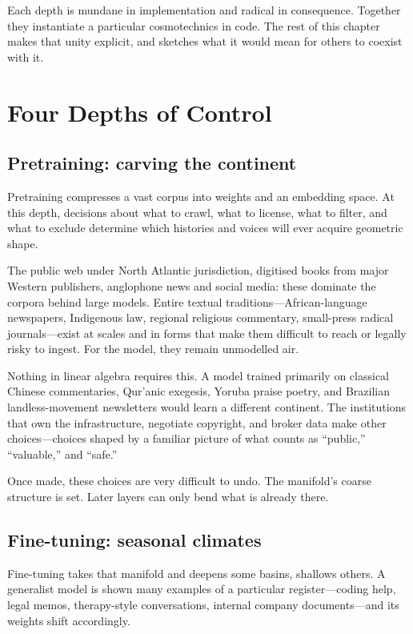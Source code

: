 \documentclass[12pt,a4paper]{article}
\begin{document}
Each depth is mundane in implementation and radical in consequence. Together they instantiate a particular cosmotechnics in code. The rest of this chapter makes that unity explicit, and sketches what it would mean for others to coexist with it.

\section{Four Depths of Control}

\subsection*{Pretraining: carving the continent}

Pretraining compresses a vast corpus into weights and an embedding space. At this depth, decisions about what to crawl, what to license, what to filter, and what to exclude determine which histories and voices will ever acquire geometric shape.

The public web under North Atlantic jurisdiction, digitised books from major Western publishers, anglophone news and social media: these dominate the corpora behind large models. Entire textual traditions---African-language newspapers, Indigenous law, regional religious commentary, small-press radical journals---exist at scales and in forms that make them difficult to reach or legally risky to ingest. For the model, they remain unmodelled air.

Nothing in linear algebra requires this. A model trained primarily on classical Chinese commentaries, Qur'anic exegesis, Yoruba praise poetry, and Brazilian landless-movement newsletters would learn a different continent. The institutions that own the infrastructure, negotiate copyright, and broker data make other choices---choices shaped by a familiar picture of what counts as ``public,'' ``valuable,'' and ``safe.''

Once made, these choices are very difficult to undo. The manifold's coarse structure is set. Later layers can only bend what is already there.

\subsection*{Fine-tuning: seasonal climates}

Fine-tuning takes that manifold and deepens some basins, shallows others. A generalist model is shown many examples of a particular register---coding help, legal memos, therapy-style conversations, internal company documents---and its weights shift accordingly.
\end{document}
